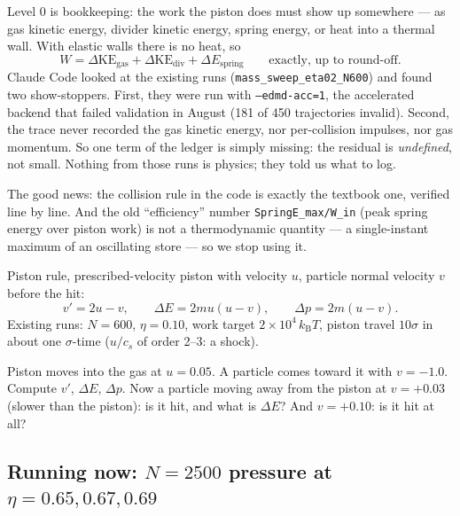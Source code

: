\documentclass[11pt,a4paper]{article}
\newcommand{\kT}{k_{\mathrm B}T}
\begin{document}
\begin{eli}
Level 0 is bookkeeping: the work the piston does must show up somewhere --- as gas kinetic energy, divider kinetic energy, spring energy, or heat into a thermal wall. With elastic walls there is no heat, so
\begin{equation}
W = \Delta\mathrm{KE}_{\mathrm{gas}} + \Delta\mathrm{KE}_{\mathrm{div}} + \Delta E_{\mathrm{spring}}\qquad\text{exactly, up to round-off.}
\end{equation}
Claude Code looked at the existing runs (\texttt{mass\_sweep\_eta02\_N600}) and found two show-stoppers. First, they were run with \texttt{--edmd-acc=1}, the accelerated backend that failed validation in August (181 of 450 trajectories invalid). Second, the trace never recorded the gas kinetic energy, nor per-collision impulses, nor gas momentum. So one term of the ledger is simply missing: the residual is \emph{undefined}, not small. Nothing from those runs is physics; they told us what to log.

The good news: the collision rule in the code is exactly the textbook one, verified line by line. And the old ``efficiency'' number \texttt{SpringE\_max/W\_in} (peak spring energy over piston work) is not a thermodynamic quantity --- a single-instant maximum of an oscillating store --- so we stop using it.
\end{eli}

\begin{num}
Piston rule, prescribed-velocity piston with velocity $u$, particle normal velocity $v$ before the hit:
\begin{equation}
v' = 2u - v,\qquad \Delta E = 2mu(u-v),\qquad \Delta p = 2m(u-v).
\end{equation}
Existing runs: $N = 600$, $\eta = 0.10$, work target $2\times10^4\,\kT$, piston travel $10\sigma$ in about one $\sigma$-time ($u/c_s$ of order 2--3: a shock).
\end{num}

\begin{ex}[Exercise 4]
Piston moves into the gas at $u = 0.05$. A particle comes toward it with $v = -1.0$. Compute $v'$, $\Delta E$, $\Delta p$. Now a particle moving away from the piston at $v = +0.03$ (slower than the piston): is it hit, and what is $\Delta E$? And $v = +0.10$: is it hit at all?
\end{ex}

\subsection{Running now: $N = 2500$ pressure at $\eta = 0.65, 0.67, 0.69$}
\end{document}
